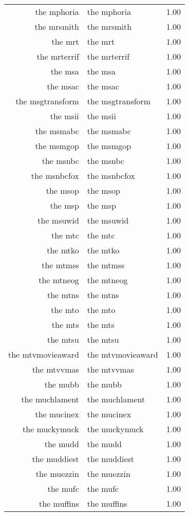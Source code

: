 \begin{table}[ht]
\begin{tabular}{rlr}
  the mphoria & the mphoria & 1.00 \\ 
  the mrsmith & the mrsmith & 1.00 \\ 
  the mrt & the mrt & 1.00 \\ 
  the mrterrif & the mrterrif & 1.00 \\ 
  the msa & the msa & 1.00 \\ 
  the msac & the msac & 1.00 \\ 
  the msgtransform & the msgtransform & 1.00 \\ 
  the msii & the msii & 1.00 \\ 
  the msmabc & the msmabc & 1.00 \\ 
  the msmgop & the msmgop & 1.00 \\ 
  the msnbc & the msnbc & 1.00 \\ 
  the msnbcfox & the msnbcfox & 1.00 \\ 
  the msop & the msop & 1.00 \\ 
  the msp & the msp & 1.00 \\ 
  the msuwid & the msuwid & 1.00 \\ 
  the mtc & the mtc & 1.00 \\ 
  the mtko & the mtko & 1.00 \\ 
  the mtmss & the mtmss & 1.00 \\ 
  the mtneog & the mtneog & 1.00 \\ 
  the mtns & the mtns & 1.00 \\ 
  the mto & the mto & 1.00 \\ 
  the mts & the mts & 1.00 \\ 
  the mtsu & the mtsu & 1.00 \\ 
  the mtvmovieaward & the mtvmovieaward & 1.00 \\ 
  the mtvvmas & the mtvvmas & 1.00 \\ 
  the mubb & the mubb & 1.00 \\ 
  the muchlament & the muchlament & 1.00 \\ 
  the mucinex & the mucinex & 1.00 \\ 
  the muckymuck & the muckymuck & 1.00 \\ 
  the mudd & the mudd & 1.00 \\ 
  the muddiest & the muddiest & 1.00 \\ 
  the muezzin & the muezzin & 1.00 \\ 
  the mufc & the mufc & 1.00 \\ 
  the muffins & the muffins & 1.00 \\ 

\end{tabular}
\end{table}
